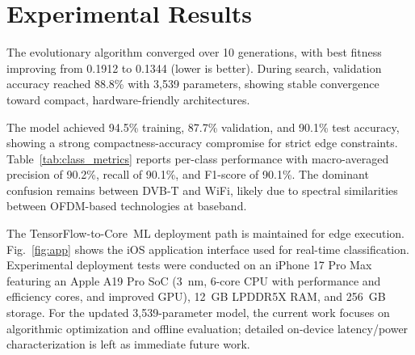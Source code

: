 \documentclass[conference]{IEEEtran}
\begin{document}
\section{Experimental Results}

The evolutionary algorithm converged over 10 generations, with best fitness improving from 0.1912 to 0.1344 (lower is better). During search, validation accuracy reached 88.8\% with 3,539 parameters, showing stable convergence toward compact, hardware-friendly architectures.

The model achieved 94.5\% training, 87.7\% validation, and 90.1\% test accuracy, showing a strong compactness-accuracy compromise for strict edge constraints. Table~\ref{tab:class_metrics} reports per-class performance with macro-averaged precision of 90.2\%, recall of 90.1\%, and F1-score of 90.1\%. The dominant confusion remains between DVB-T and WiFi, likely due to spectral similarities between OFDM-based technologies at baseband.

\begin{table}[htbp]
\caption{Per-Class Classification Metrics and Confusion Matrix (\%)}
\begin{center}
\label{tab:class_metrics}
\end{center}
\end{table}

The TensorFlow-to-Core~ML deployment path is maintained for edge execution. Fig.~\ref{fig:app} shows the iOS application interface used for real-time classification. Experimental deployment tests were conducted on an iPhone 17 Pro Max featuring an Apple A19 Pro SoC (3~nm, 6-core CPU with performance and efficiency cores, and improved GPU), 12~GB LPDDR5X RAM, and 256~GB storage. For the updated 3,539-parameter model, the current work focuses on algorithmic optimization and offline evaluation; detailed on-device latency/power characterization is left as immediate future work.
\end{document}
